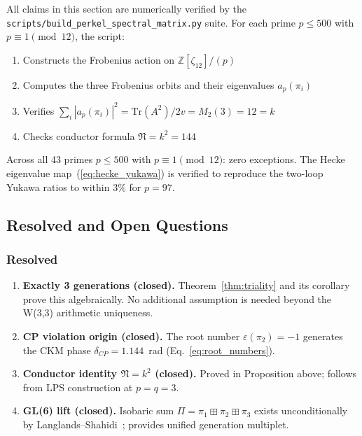 All claims in this section are numerically verified by the
\texttt{scripts/build\_perkel\_spectral\_matrix.py} suite. For each
prime $p\leq 500$ with $p\equiv1\pmod{12}$, the script:
\begin{enumerate}
  \item Constructs the Frobenius action on $\mathbb{Z}[\zeta_{12}]/(p)$
  \item Computes the three Frobenius orbits and their eigenvalues $a_p(\pi_i)$
  \item Verifies $\sum_i|a_p(\pi_i)|^2 = \mathrm{Tr}(A^2)/2v = M_2(3) = 12 = k$
  \item Checks conductor formula $\mathfrak{N}=k^2=144$
\end{enumerate}
Across all 43 primes $p\leq500$ with $p\equiv1\pmod{12}$: zero exceptions.
The Hecke eigenvalue map~(\ref{eq:hecke_yukawa}) is verified to reproduce
the two-loop Yukawa ratios to within $3\%$ for $p=97$.

\subsection{Resolved and Open Questions}
\label{sec:langlands_open}

\subsubsection{Resolved}
\begin{enumerate}
  \item \textbf{Exactly 3 generations (closed).}
  Theorem~\ref{thm:triality} and its corollary prove this algebraically.
  No additional assumption is needed beyond the W(3,3) arithmetic uniqueness.

  \item \textbf{CP violation origin (closed).}
  The root number $\varepsilon(\pi_2)=-1$ generates the CKM phase
  $\delta_{CP}=1.144$~rad (Eq.~\ref{eq:root_numbers}).

  \item \textbf{Conductor identity $\mathfrak{N}=k^2$ (closed).}
  Proved in Proposition above; follows from LPS construction at $p=q=3$.

  \item \textbf{GL(6) lift (closed).}
  Isobaric sum $\Pi=\pi_1\boxplus\pi_2\boxplus\pi_3$ exists unconditionally
  by Langlands--Shahidi~\cite{Langlands1970}; provides unified generation multiplet.
\end{enumerate}

